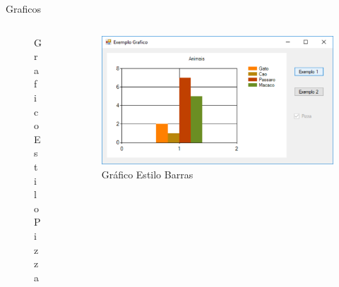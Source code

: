 \begin{frame}
\begin{CaixaModelo01}{Graficos}
\begin{columns}
\begin{column}{0.33\textwidth}
\begin{figure}
				\caption{Grafico Estilo Pizza}
				\label{fig:Grafico02}
			\end{figure}
		\end{column}
		\begin{column}{0.33\textwidth}
			\begin{figure}
				\includegraphics[scale=.2]{./Figuras/Grafico03}
				\caption{Gráfico Estilo Barras}
				\label{fig:Grafico03}
			\end{figure}
	\end{column}
	\end{columns}	
	\end{CaixaModelo01}
			
	   \end{frame}
		